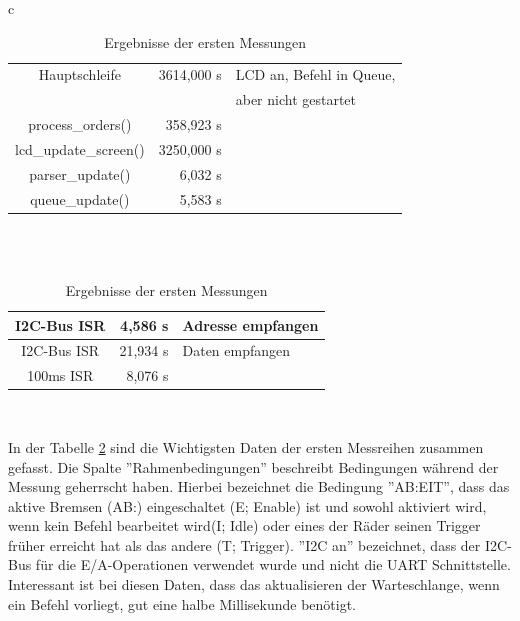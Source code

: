 \begin{table}[htb]
\begin{center}
\begin{tabular}{c}
\begin{tabularx}{\textwidth}{|c||r|X|}
		\hline
		Hauptschleife & 3614,000 \textmu{}s & LCD an, Befehl in Queue, \\
		& & aber nicht gestartet \\ \hline
		process\_orders() & 358,923 \textmu{}s &  \\ \hline
		lcd\_update\_screen() & 3250,000 \textmu{}s &  \\ \hline
		parser\_update() & 6,032 \textmu{}s &  \\ \hline
		queue\_update() & 5,583 \textmu{}s &  \\ \hline
	\end{tabularx} \\
	\\
	\begin{tabularx}{\textwidth}{|c||r|X|}
		\hline
		I2C-Bus ISR & 4,586 \textmu{}s & Adresse empfangen \\ \hline
		I2C-Bus ISR & 21,934 \textmu{}s & Daten empfangen \\ \hline
		100ms ISR & 8,076 \textmu{}s & \\ \hline
	\end{tabularx} \\
	\end{tabular}
	\caption{\label{erste_messung} Ergebnisse der ersten Messungen}
\end{center}
\end{table}
In der Tabelle \ref{erste_messung} sind die Wichtigsten Daten der ersten Messreihen zusammen
gefasst. Die Spalte ''Rahmenbedingungen'' beschreibt Bedingungen während der Messung geherrscht haben.
Hierbei bezeichnet die Bedingung ''AB:EIT'', dass das aktive Bremsen (AB:) eingeschaltet (E; Enable) ist und
sowohl aktiviert wird, wenn kein Befehl bearbeitet wird(I; Idle) oder eines der Räder seinen Trigger früher
erreicht hat als das andere (T; Trigger). ''I2C an'' bezeichnet, dass der I2C-Bus für die E/A-Operationen
verwendet wurde und nicht die UART Schnittstelle.\\
Interessant ist bei diesen Daten, dass das aktualisieren der Warteschlange, wenn ein Befehl vorliegt, gut
eine halbe Millisekunde benötigt.

